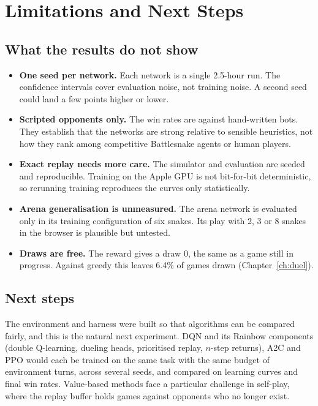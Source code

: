 \chapter{Limitations and Next Steps}\label{ch:limits}

\section{What the results do not show}

\begin{warnbox}
\begin{itemize}
\item \textbf{One seed per network.} Each network is a single 2.5-hour run. The
  confidence intervals cover evaluation noise, not training noise. A second seed could
  land a few points higher or lower.
\item \textbf{Scripted opponents only.} The win rates are against hand-written bots.
  They establish that the networks are strong relative to sensible heuristics, not how
  they rank among competitive Battlesnake agents or human players.
\item \textbf{Exact replay needs more care.} The simulator and evaluation are seeded and
  reproducible. Training on the Apple GPU is not bit-for-bit deterministic, so rerunning
  training reproduces the curves only statistically.
\item \textbf{Arena generalisation is unmeasured.} The arena network is evaluated only
  in its training configuration of six snakes. Its play with 2, 3 or 8 snakes in the
  browser is plausible but untested.
\item \textbf{Draws are free.} The reward gives a draw $0$, the same as a game still in
  progress. Against greedy this leaves 6.4\% of games drawn (Chapter~\ref{ch:duel}).
\end{itemize}
\end{warnbox}

\section{Next steps}

\begin{keybox}
The environment and harness were built so that algorithms can be compared fairly, and
this is the natural next experiment. DQN and its Rainbow components (double Q-learning,
dueling heads, prioritised replay, $n$-step returns), A2C and PPO would each be trained
on the same task with the same budget of environment turns, across several seeds,
and compared on learning curves and final win rates. Value-based methods face a
particular challenge in self-play, where the replay buffer holds games against
opponents who no longer exist.
\end{keybox}


